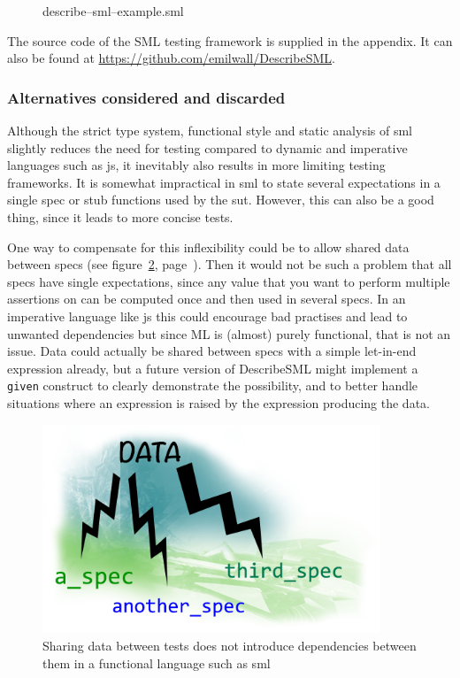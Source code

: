 \documentclass[11pt]{article}
\begin{document}
\begin{figure}[ht!]

\caption{describe–sml–example.sml}
\label{lst:describesmlexample}
\end{figure}

The source code of the SML testing framework is supplied in the appendix. It can also be found at \url{https://github.com/emilwall/DescribeSML}.

\subsubsection{Alternatives considered and discarded}

Although the strict type system, functional style and static analysis of \gls{sml} slightly reduces the need for testing compared to dynamic and imperative languages such as \gls{js}, it inevitably also results in more limiting testing frameworks. It is somewhat impractical in \gls{sml} to state several expectations in a single \gls{spec} or stub functions used by the \gls{sut}. However, this can also be a good thing, since it leads to more concise tests.

One way to compensate for this inflexibility could be to allow shared data between \glspl{spec} (see figure~\ref{fig:data}, page~\pageref{fig:data}). Then it would not be such a problem that all \glspl{spec} have single expectations, since any value that you want to perform multiple assertions on can be computed once and then used in several \glspl{spec}. In an imperative language like \gls{js} this could encourage bad practises and lead to unwanted dependencies but since ML is (almost) purely functional, that is not an issue. Data could actually be shared between \glspl{spec} with a simple let-in-end expression already, but a future version of DescribeSML might implement a \texttt{given} construct to clearly demonstrate the possibility, and to better handle situations where an expression is raised by the expression producing the data.

\begin{figure}[ht!]
\centering
\includegraphics[width=0.9\textwidth]{pics/data.png}
\caption{Sharing data between tests does not introduce dependencies between them in a functional language such as \gls{sml}}
\label{fig:data}
\end{figure}
\end{document}
